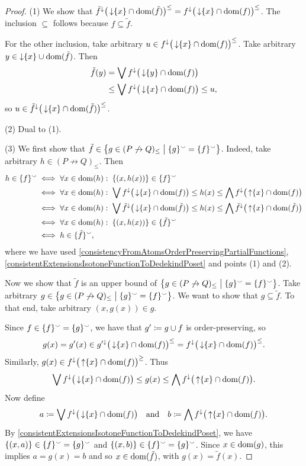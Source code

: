 \begin{proof}
(1) We show that $\tilde{f}^\downarrow\big(\operatorname{\downarrow} \{x\} \cap \operatorname{dom}(\tilde{f})\big)^\leq = f^\downarrow\big(\operatorname{\downarrow} \{x\} \cap \operatorname{dom}(f)\big)^\leq$. The inclusion $\subseteq$ follows because $f\subseteq \tilde{f}$.

For the other inclusion, take arbitrary $u \in f^\downarrow\big(\operatorname{\downarrow} \{x\} \cap \operatorname{dom}(f)\big)^\leq$. Take arbitrary $y\in \operatorname{\downarrow}\{x\} \cup \operatorname{dom}(\tilde{f})$. Then
\begin{align*}
\tilde{f}(y) &= \bigvee f^\downarrow\big(\operatorname{\downarrow}\{y\} \cap \operatorname{dom}(f)\big) \\
&\leq \bigvee f^\downarrow\big(\operatorname{\downarrow}\{x\} \cap \operatorname{dom}(f)\big) \leq u,
\end{align*}
so $u\in \tilde{f}^\downarrow\big(\operatorname{\downarrow} \{x\} \cap \operatorname{dom}(\tilde{f})\big)^\leq$.

(2) Dual to (1).

(3) We first show that $\tilde{f} \in \setbuilder{g\in (P\not\to Q)_\leq}{\{g\}^\cons = \{f\}^\cons}$. Indeed, take arbitrary $h\in (P\not\to Q)_\leq$. Then
\begin{align*}
h\in \{f\}^\smallsmile &\iff \forall x\in \operatorname{dom}(h): \; \{(x, h(x))\} \in \{f\}^\smallsmile \\
&\iff \forall x\in \operatorname{dom}(h): \; \bigvee f^\downarrow\big(\operatorname{\downarrow} \{x\} \cap \operatorname{dom}(f)\big) \leq h(x) \leq \bigwedge f^\downarrow\big(\operatorname{\uparrow} \{x\} \cap \operatorname{dom}(f)\big) \\
&\iff \forall x\in \operatorname{dom}(h): \; \bigvee \tilde{f}^\downarrow\big(\operatorname{\downarrow} \{x\} \cap \operatorname{dom}(\tilde{f})\big) \leq h(x) \leq \bigwedge \tilde{f}^\downarrow\big(\operatorname{\uparrow} \{x\} \cap \operatorname{dom}(\tilde{f})\big) \\
&\iff \forall x\in \operatorname{dom}(h): \; \{(x, h(x))\} \in \{\tilde{f}\}^\smallsmile \\
&\iff h\in \{\tilde{f}\}^\smallsmile,
\end{align*}
where we have used \ref{consistencyFromAtomsOrderPreservingPartialFunctions}, \ref{consistentExtensionsIsotoneFunctionToDedekindPoset} and points (1) and (2).

Now we show that $\tilde{f}$ is an upper bound of $\setbuilder{g\in (P\not\to Q)_\leq}{\{g\}^\cons = \{f\}^\cons}$. Take arbitrary $g \in \setbuilder{g\in (P\not\to Q)_\leq}{\{g\}^\cons = \{f\}^\cons}$. We want to show that $g\subseteq \tilde{f}$. To that end, take arbitrary $(x,g(x))\in g$.

Since $f\in \{f\}^\smallsmile = \{g\}^\smallsmile$, we have that $g' \coloneqq g\cup f$ is order-preserving, so
\[ g(x) = g'(x) \in g^{\prime\downarrow}\big(\operatorname{\downarrow}\{x\} \cap \operatorname{dom}(f)\big)^\leq = f^\downarrow\big(\operatorname{\downarrow}\{x\} \cap \operatorname{dom}(f)\big)^\leq. \]
Similarly, $g(x) \in f^\downarrow\big(\operatorname{\uparrow}\{x\} \cap \operatorname{dom}(f)\big)^\geq$. Thus
\[ \bigvee f^\downarrow\big(\operatorname{\downarrow} \{x\} \cap \operatorname{dom}(f)\big) \leq g(x) \leq \bigwedge f^\downarrow\big(\operatorname{\uparrow} \{x\} \cap \operatorname{dom}(f)\big). \]
Now define
\[ a \coloneqq \bigvee f^\downarrow\big(\operatorname{\downarrow} \{x\} \cap \operatorname{dom}(f)\big) \quad\text{and}\quad b \coloneqq  \bigwedge f^\downarrow\big(\operatorname{\uparrow} \{x\} \cap \operatorname{dom}(f)\big). \] 
By \ref{consistentExtensionsIsotoneFunctionToDedekindPoset}, we have $\{(x,a)\} \in \{f\}^\smallsmile = \{g\}^\smallsmile$ and $\{(x,b)\}\in \{f\}^\smallsmile = \{g\}^\smallsmile$. Since $x\in \operatorname{dom}(g)$, this implies $a = g(x) = b$ and so $x\in\operatorname{dom}(\tilde{f})$, with $g(x) = \tilde{f}(x)$.
\end{proof}

